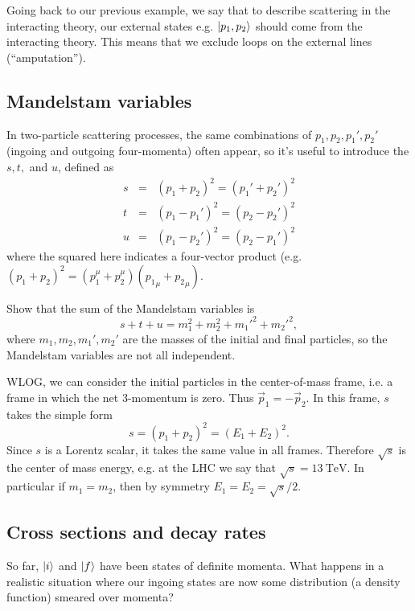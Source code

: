 Going back to our previous example, we say that to describe scattering in the interacting theory, our external states  e.g. $\left| p_1,p_2 \right>$ should come from the interacting theory. This means that we exclude loops on the external lines (``amputation'').

\subsection*{Mandelstam variables} In two-particle scattering processes, the same combinations of $p_1,p_2,p_1',p_2'$ (ingoing and outgoing four-momenta) often appear, so it's useful to introduce the  $s,t,$ and $u$, defined as
\begin{eqnarray*}
s&=&(p_1+p_2)^2=(p_1'+p_2')^2\\
t&=&(p_1-p_1')^2=(p_2-p_2')^2\\
u&=&(p_1-p_2')^2=(p_2-p_1')^2
\end{eqnarray*}
where the squared here indicates a four-vector product (e.g. $(p_1+p_2)^2=(p_1^\mu+p_2^\mu)({p_1}_\mu+{p_2}_\mu).$
\begin{ex}
Show that the sum of the Mandelstam variables is
$$s+t+u=m_1^2+m_2^2+{m_1'}^2+{m_2'}^2,$$
where $m_1,m_2,m_1',m_2'$ are the masses of the initial and final particles, so the Mandelstam variables are not all independent.
\end{ex}

WLOG, we can consider the initial particles in the center-of-mass frame, i.e. a frame in which the net $3$-momentum is zero. Thus $\vec{p}_1=-\vec{p}_2.$
In this frame, $s$ takes the simple form
$$s=(p_1+p_2)^2=(E_1+E_2)^2.$$ Since $s$ is a Lorentz scalar, it takes the same value in all frames. Therefore $\sqrt{s}$ is the center of mass energy, e.g. at the LHC we say that $\sqrt{s}=\SI{13}{\tera\electronvolt}$. In particular if $m_1=m_2$, then by symmetry $E_1=E_2=\sqrt{s}/2.$

\subsection*{Cross sections and decay rates} So far, $\left| i \right>$ and $\left| f \right>$ have been states of definite momenta. What happens in a realistic situation where our ingoing states are now some distribution (a density function) smeared over momenta?

